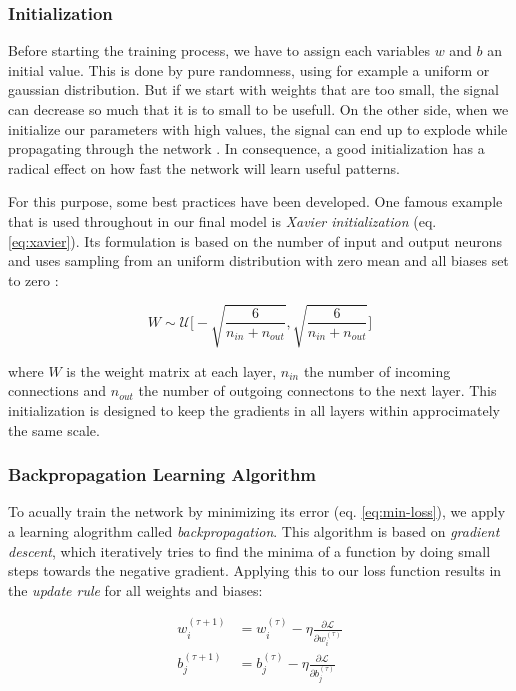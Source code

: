 \subsubsection{Initialization}

Before starting the training process, we have to assign each variables $ w $ and $ b $ an initial value. This is done by pure randomness, using for example a uniform or gaussian distribution. But if we start with weights that are too small, the signal can decrease so much that it is to small to be usefull. On the other side, when we initialize our parameters with high values, the signal can end up to explode while propagating through the network \parencite{understand_xavier}. In consequence, a good initialization has a radical effect on how fast the network will learn useful patterns.

For this purpose, some best practices have been developed. One famous example that is used throughout in our final model is \textit{Xavier initialization} (eq. \ref{eq:xavier}). Its formulation is based on the number of input and output neurons and uses sampling from an uniform distribution with zero mean and all biases set to zero \parencite{xavier-init}:

\begin{equation} \label{eq:xavier}
  W \sim \mathcal{U} \bigg[-\sqrt{\frac{6}{n_{in} + n_{out}}}, \sqrt{\frac{6}{n_{in} + n_{out}}}\bigg]
\end{equation}

where $ W $ is the weight matrix at each layer, $ n_{in} $ the number of incoming connections and $ n_{out} $ the number of outgoing connectons to the next layer. This initialization is designed to keep the gradients in all layers within approcimately the same scale.

\subsubsection{Backpropagation Learning Algorithm}

To acually train the network by minimizing its error (eq. \ref{eq:min-loss}), we apply a learning alogrithm called \textit{backpropagation}. This algorithm is based on \textit{gradient descent}, which iteratively tries to find the minima of a function by doing small steps towards the negative gradient. Applying this to our loss function results in the \textit{update rule} for all weights and biases:

\begin{equation} \label{eq:gradient_descent}
\begin{aligned}
w_{i}^{(\tau + 1)} &= w_{i}^{(\tau)} - \eta \frac{\partial \mathcal{L}}{\partial w_{i}^{(\tau)}} \\
b_{j}^{(\tau + 1)} &= b_{j}^{(\tau)} - \eta \frac{\partial \mathcal{L}}{\partial b_{j}^{(\tau)}}
\end{aligned}
\end{equation}

